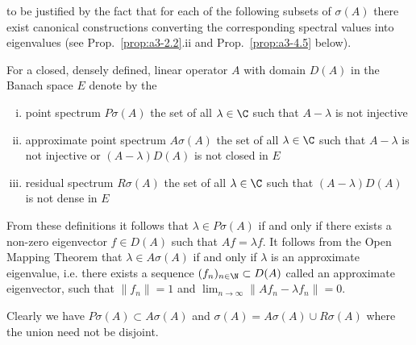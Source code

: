 \newpage

to be justified by the fact that for each of the following subsets of $\sigma(A)$ there exist canonical constructions converting the corresponding spectral values into eigenvalues (see Prop.~\ref{prop:a3-2.2}.ii and Prop.~\ref{prop:a3-4.5} below).
\begin{definition}\label{def:a3-2.1}
For a closed, densely defined, linear operator $A$ with domain $D(A)$ in the Banach space $E$ denote by the
\begin{enumerate}[(i)]
\item point spectrum $P\sigma(A)$ the set of all $\lambda \in \C$ such that $A - \lambda$ is not injective

\item approximate point spectrum $A\sigma(A)$ the set of all $\lambda \in \C$ such that $A - \lambda$ is not injective or $(A - \lambda)D(A)$ is not closed in $E$

\item residual spectrum $R\sigma(A)$ the set of all $\lambda \in \C$ such that $(A - \lambda)D(A)$ is not dense in $E$

\end{enumerate}
\end{definition}
From these definitions it follows that $\lambda \in P\sigma(A)$ if and only if there exists a non-zero eigenvector $f \in D(A)$ such that $Af = \lambda f$.
It follows from the Open Mapping Theorem that $\lambda \in A\sigma(A)$ if and only if $\lambda$ is an approximate eigenvalue, i.e. there exists a sequence $(f_{n})_{n \in \N} \subset D(A)$ called an approximate eigenvector, such that $\|f_{n}\| = 1$ and $ \lim_{n \to \infty} \|Af_{n} - \lambda f_{n}\| = 0$.


Clearly we have $P\sigma(A) \subset A\sigma(A)$ and $\sigma(A) = A\sigma(A) \cup R\sigma(A)$ where the union need not be disjoint.

